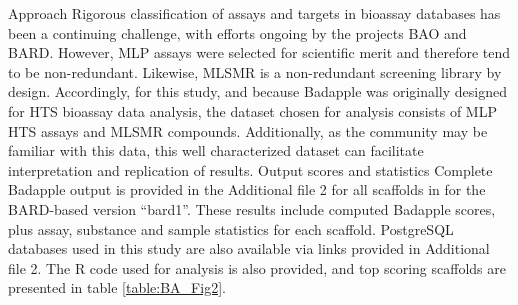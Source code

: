 Approach Rigorous classification of assays and targets in bioassay databases has been a continuing challenge, with efforts ongoing by the projects BAO and BARD. However, MLP assays were selected for scientific merit and therefore tend to be non-redundant. Likewise, MLSMR is a non-redundant screening library by design. Accordingly, for this study, and because Badapple was originally designed for HTS bioassay data analysis, the dataset chosen for analysis consists of MLP HTS assays and MLSMR compounds. Additionally, as the community may be familiar with this data, this well characterized dataset can facilitate interpretation and replication of results.
Output scores and statistics Complete Badapple output is provided in the Additional file 2 for all scaffolds in for the BARD-based version “bard1”. These results include computed Badapple scores, plus assay, substance and sample statistics for each scaffold. PostgreSQL databases used in this study are also available via links provided in Additional file 2. The R code used for analysis is also provided, and top scoring scaffolds are presented in table \ref{table:BA_Fig2}.

